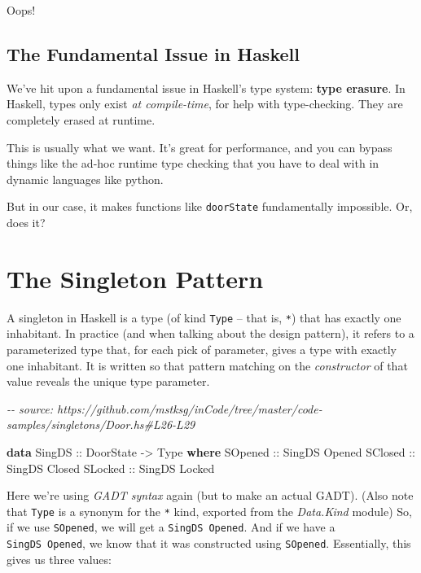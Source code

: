 \documentclass[]{article}
\newenvironment{Shaded}{}{}
\newcommand{\CommentTok}[1]{\textcolor[rgb]{0.38,0.63,0.69}{\textit{#1}}}
\newcommand{\DataTypeTok}[1]{\textcolor[rgb]{0.56,0.13,0.00}{#1}}
\newcommand{\KeywordTok}[1]{\textcolor[rgb]{0.00,0.44,0.13}{\textbf{#1}}}
\newcommand{\OtherTok}[1]{\textcolor[rgb]{0.00,0.44,0.13}{#1}}
\begin{document}
Oops!

\hypertarget{the-fundamental-issue-in-haskell}{%
\subsection{The Fundamental Issue in
Haskell}\label{the-fundamental-issue-in-haskell}}

We've hit upon a fundamental issue in Haskell's type system: \textbf{type
erasure}. In Haskell, types only exist \emph{at compile-time}, for help with
type-checking. They are completely erased at runtime.

This is usually what we want. It's great for performance, and you can bypass
things like the ad-hoc runtime type checking that you have to deal with in
dynamic languages like python.

But in our case, it makes functions like \texttt{doorState} fundamentally
impossible. Or, does it?

\hypertarget{the-singleton-pattern}{%
\section{The Singleton Pattern}\label{the-singleton-pattern}}

A singleton in Haskell is a type (of kind \texttt{Type} -- that is, \texttt{*})
that has exactly one inhabitant. In practice (and when talking about the design
pattern), it refers to a parameterized type that, for each pick of parameter,
gives a type with exactly one inhabitant. It is written so that pattern matching
on the \emph{constructor} of that value reveals the unique type parameter.

\begin{Shaded}
\begin{Highlighting}[]
\CommentTok{{-}{-} source: https://github.com/mstksg/inCode/tree/master/code{-}samples/singletons/Door.hs\#L26{-}L29}

\KeywordTok{data} \DataTypeTok{SingDS}\OtherTok{ ::} \DataTypeTok{DoorState} \OtherTok{{-}>} \DataTypeTok{Type} \KeywordTok{where}
    \DataTypeTok{SOpened}\OtherTok{ ::} \DataTypeTok{SingDS} \DataTypeTok{\textquotesingle{}Opened}
    \DataTypeTok{SClosed}\OtherTok{ ::} \DataTypeTok{SingDS} \DataTypeTok{\textquotesingle{}Closed}
    \DataTypeTok{SLocked}\OtherTok{ ::} \DataTypeTok{SingDS} \DataTypeTok{\textquotesingle{}Locked}
\end{Highlighting}
\end{Shaded}

Here we're using \emph{GADT syntax} again (but to make an actual GADT). (Also
note that \texttt{Type} is a synonym for the \texttt{*} kind, exported from the
\emph{Data.Kind} module) So, if we use \texttt{SOpened}, we will get a
\texttt{SingDS\ \textquotesingle{}Opened}. And if we have a
\texttt{SingDS\ \textquotesingle{}Opened}, we know that it was constructed using
\texttt{SOpened}. Essentially, this gives us three values:
\end{document}
